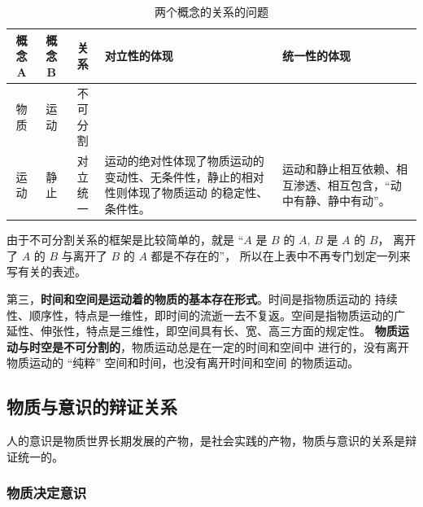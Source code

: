 \documentclass[11pt, UTF8]{book} %
\begin{document}
\begin{table}[H]
    \centering\small
    \caption{两个概念的关系的问题}
    \begin{tabular}{cc|c p{} p{}}
        \hline
        \textbf{概念 A} & \textbf{概念 B} & \textbf{关系} & \textbf{对立性的体现} & \textbf{统一性的体现} \\ 
        \hline
        物质 & 运动 & 不可分割 \\ 
        \hline
        运动 & 静止 & 对立统一 & 运动的绝对性体现了物质运动的变动性、无条件性，静止的相对性则体现了物质运动
        的稳定性、条件性。 & 运动和静止相互依赖、相互渗透、相互包含，“动中有静、静中有动”。 \\
        \hline
    \end{tabular}
    \begin{remark}
        由于不可分割关系的框架是比较简单的，就是 “$A$ 是 $B$ 的 $A$, $B$ 是 $A$ 的 $B$，
        离开了 $A$ 的 $B$ 与离开了 $B$ 的 $A$ 都是不存在的”，
        所以在上表中不再专门划定一列来写有关的表述。
    \end{remark}
\end{table}

第三，\textbf{时间和空间是运动着的物质的基本存在形式}。时间是指物质运动的
持续性、顺序性，特点是一维性，即时间的流逝一去不复返。空间是指物质运动的广
延性、伸张性，特点是三维性，即空间具有长、宽、高三方面的规定性。
\textbf{物质运动与时空是不可分割的}，物质运动总是在一定的时间和空间中
进行的，没有离开物质运动的 “纯粹” 空间和时间，也没有离开时间和空间
的物质运动。


\subsection{物质与意识的辩证关系}

人的意识是物质世界长期发展的产物，是社会实践的产物，物质与意识的关系是辩证统一的。

\subsubsection{物质决定意识}
\end{document}
